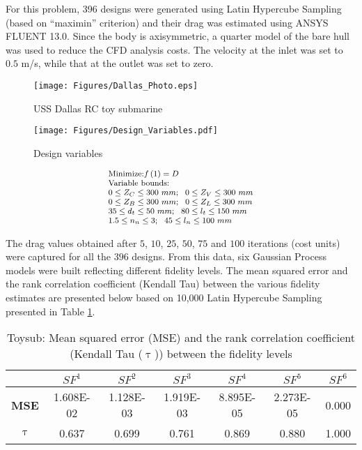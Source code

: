 For this problem, 396 designs were generated using Latin Hypercube Sampling (based on ``maximin'' criterion) and their drag was estimated using ANSYS FLUENT 13.0. Since the body is axisymmetric, a quarter model of the bare hull was used to reduce the CFD analysis costs. The velocity at the inlet was set to $0.5$ m/s, while that at the outlet was set to zero. 

\begin{figure}[!htb]
	\centering
	\texttt{[image: Figures/Dallas\_Photo.eps]}
	\caption{USS Dallas RC toy submarine}
	\label{fig:dallas_photo}       
\end{figure}

\begin{figure}[!ht]
	\centering
	\texttt{[image: Figures/Design\_Variables.pdf]}
	\caption{Design variables}
	\label{fig:toysub_param_illum}      
\end{figure}

\begin{equation}\footnotesize
\begin{array}[p]{l}
\text{Minimize:}f\left(1\right) = D \\
\text{Variable bounds:}
\\
0 \le Z_C \le 300~mm;~~0 \le Z_V \le 300~mm
\\
0 \le Z_B \le 300~mm;~~0 \le Z_L \le 300~mm
\\
35 \le d_t \le 50~mm;~~80 \le l_t \le 150~mm
\\
1.5 \le n_n \le 3;~~45 \le l_n \le 100~mm
\label{eq:formulation_toysub}
\end{array}
\end{equation}

The drag values obtained after $5$, $10$, $25$, $50$, $75$ and $100$ iterations (cost units) were captured for all the $396$ designs. From this data,  six Gaussian Process models were built reflecting different fidelity levels. The mean squared error and the rank correlation coefficient (Kendall Tau) between the various fidelity estimates are presented below based on 10,000 Latin Hypercube Sampling presented in Table \ref{table:mse_tau_toysub}.

\begin{table}[!htb]\footnotesize
	\centering
	\caption{Toysub: Mean squared error (MSE) and the rank correlation coefficient (Kendall Tau ($\uptau$)) between the fidelity levels}
	\label{table:mse_tau_toysub}
	\begin{tabular}{|c|c|c|c|c|c|c|}
		\noalign{\smallskip}\hline
		&$SF^1$&$SF^2$&$SF^3$&$SF^4$&$SF^5$&$SF^6$\\ \hline
		\textbf{MSE}&1.608E-02&1.128E-03&1.919E-03&8.895E-05&2.273E-05&0.000\\ \hline
		\textbf{$\uptau$}&0.637&0.699&0.761& 0.869& 0.880& 1.000\\ \hline
	\end{tabular}
\end{table}

